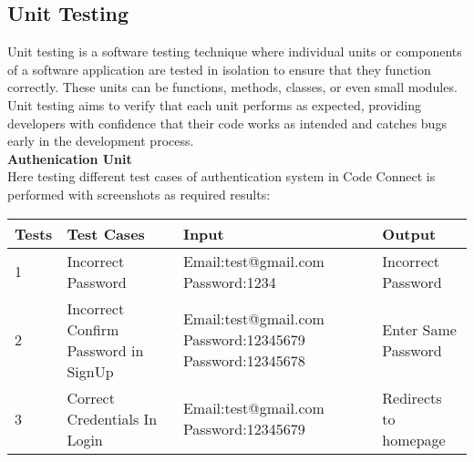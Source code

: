 \subsection{Unit Testing}
Unit testing is a software testing technique where individual units or components of a software application are tested in isolation to ensure that they function correctly. These units can be functions, methods, classes, or even small modules. Unit testing aims to verify that each unit performs as expected, providing developers with confidence that their code works as intended and catches bugs early in the development process.
\\
\textbf{Authenication Unit}\\
Here testing different test cases of authentication system in Code Connect is performed with screenshots as required results:\\
\begin{tabular}{|p{0.3in}|p{1.5in}|p{1.5in}|p{1.5in}|}
    \hline
    Tests & Test Cases & Input & Output \\
    \hline
        1 & Incorrect Password& Email:test@gmail.com Password:1234& Incorrect Password \\
        \hline
        2 & Incorrect Confirm Password in SignUp & Email:test@gmail.com
        Password:12345679
        Password:12345678 & Enter Same Password \\
        \hline
        3 & Correct Credentials In Login & Email:test@gmail.com
        Password:12345679 & Redirects to homepage \\
        \hline
\end{tabular}


